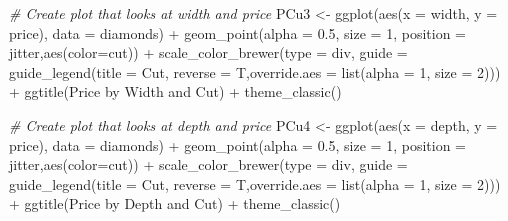\documentclass[
]{article}
\newenvironment{Shaded}{\begin{snugshade}}{\end{snugshade}}
\newcommand{\AttributeTok}[1]{\textcolor[rgb]{0.77,0.63,0.00}{#1}}
\newcommand{\CommentTok}[1]{\textcolor[rgb]{0.56,0.35,0.01}{\textit{#1}}}
\newcommand{\DecValTok}[1]{\textcolor[rgb]{0.00,0.00,0.81}{#1}}
\newcommand{\FloatTok}[1]{\textcolor[rgb]{0.00,0.00,0.81}{#1}}
\newcommand{\FunctionTok}[1]{\textcolor[rgb]{0.00,0.00,0.00}{#1}}
\newcommand{\NormalTok}[1]{#1}
\newcommand{\OtherTok}[1]{\textcolor[rgb]{0.56,0.35,0.01}{#1}}
\newcommand{\SpecialCharTok}[1]{\textcolor[rgb]{0.00,0.00,0.00}{#1}}
\newcommand{\StringTok}[1]{\textcolor[rgb]{0.31,0.60,0.02}{#1}}
\begin{document}
\begin{Shaded}
\begin{Highlighting}[]
\CommentTok{\# Create plot that looks at width and price}
\NormalTok{PCu3 }\OtherTok{\textless{}{-}} \FunctionTok{ggplot}\NormalTok{(}\FunctionTok{aes}\NormalTok{(}\AttributeTok{x =}\NormalTok{ width, }\AttributeTok{y =}\NormalTok{ price), }\AttributeTok{data =}\NormalTok{ diamonds) }\SpecialCharTok{+} \FunctionTok{geom\_point}\NormalTok{(}\AttributeTok{alpha =} \FloatTok{0.5}\NormalTok{, }\AttributeTok{size =} \DecValTok{1}\NormalTok{, }\AttributeTok{position =} \StringTok{\textquotesingle{}jitter\textquotesingle{}}\NormalTok{,}\FunctionTok{aes}\NormalTok{(}\AttributeTok{color=}\NormalTok{cut)) }\SpecialCharTok{+}
  \FunctionTok{scale\_color\_brewer}\NormalTok{(}\AttributeTok{type =} \StringTok{\textquotesingle{}div\textquotesingle{}}\NormalTok{, }\AttributeTok{guide =} \FunctionTok{guide\_legend}\NormalTok{(}\AttributeTok{title =} \StringTok{\textquotesingle{}Cut\textquotesingle{}}\NormalTok{, }\AttributeTok{reverse =}\NormalTok{ T,}\AttributeTok{override.aes =} \FunctionTok{list}\NormalTok{(}\AttributeTok{alpha =} \DecValTok{1}\NormalTok{, }\AttributeTok{size =} \DecValTok{2}\NormalTok{)))       }\SpecialCharTok{+} \FunctionTok{ggtitle}\NormalTok{(}\StringTok{\textquotesingle{}Price by Width and Cut\textquotesingle{}}\NormalTok{) }\SpecialCharTok{+} \FunctionTok{theme\_classic}\NormalTok{()}

\CommentTok{\# Create plot that looks at depth and price}
\NormalTok{PCu4 }\OtherTok{\textless{}{-}} \FunctionTok{ggplot}\NormalTok{(}\FunctionTok{aes}\NormalTok{(}\AttributeTok{x =}\NormalTok{ depth, }\AttributeTok{y =}\NormalTok{ price), }\AttributeTok{data =}\NormalTok{ diamonds) }\SpecialCharTok{+} \FunctionTok{geom\_point}\NormalTok{(}\AttributeTok{alpha =} \FloatTok{0.5}\NormalTok{, }\AttributeTok{size =} \DecValTok{1}\NormalTok{, }\AttributeTok{position =} \StringTok{\textquotesingle{}jitter\textquotesingle{}}\NormalTok{,}\FunctionTok{aes}\NormalTok{(}\AttributeTok{color=}\NormalTok{cut)) }\SpecialCharTok{+}
  \FunctionTok{scale\_color\_brewer}\NormalTok{(}\AttributeTok{type =} \StringTok{\textquotesingle{}div\textquotesingle{}}\NormalTok{, }\AttributeTok{guide =} \FunctionTok{guide\_legend}\NormalTok{(}\AttributeTok{title =} \StringTok{\textquotesingle{}Cut\textquotesingle{}}\NormalTok{, }\AttributeTok{reverse =}\NormalTok{ T,}\AttributeTok{override.aes =} \FunctionTok{list}\NormalTok{(}\AttributeTok{alpha =} \DecValTok{1}\NormalTok{, }\AttributeTok{size =} \DecValTok{2}\NormalTok{)))       }\SpecialCharTok{+} \FunctionTok{ggtitle}\NormalTok{(}\StringTok{\textquotesingle{}Price by Depth and Cut\textquotesingle{}}\NormalTok{) }\SpecialCharTok{+} \FunctionTok{theme\_classic}\NormalTok{()}


\end{Highlighting}
\end{Shaded}
\end{document}
